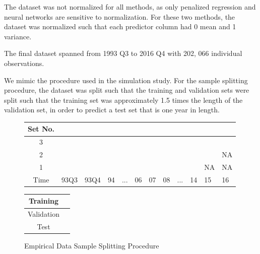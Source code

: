 \documentclass{article}
\begin{document}

The dataset was not normalized for all methods, as only penalized regression and neural networks are sensitive to normalization. For these two methods, the dataset was normalized such that each predictor column had 0 mean and 1 variance.

The final dataset spanned from 1993 Q3 to 2016 Q4 with 202, 066 individual observations.

We mimic the procedure used in the simulation study. For the sample splitting procedure, the dataset was split such that the training and validation sets were split such that the training set was approximately 1.5 times the length of the validation set, in order to predict a test set that is one year in length.

\begin{figure}[!htb]
	\begin{center}
		\begin{tabular}{|c|p{0.55cm}p{0.55cm}p{0.50cm}p{0.50cm}p{0.50cm}p{0.50cm}p{0.50cm}p{0.50cm}p{0.50cm}p{0.50cm}p{0.50cm}|}
			\hline
			Set No. &&&&&&&&&&& \\
			\hline
			3 & \cellcolor{cyan} & \cellcolor{cyan} & \cellcolor{cyan} & \cellcolor{cyan} & \cellcolor{cyan} & \cellcolor{cyan} & 
			\cellcolor{pink} & \cellcolor{pink} & \cellcolor{pink} & \cellcolor{pink} &  \cellcolor{olive} \\
			2 & \cellcolor{cyan} & \cellcolor{cyan} & \cellcolor{cyan} & \cellcolor{cyan} & \cellcolor{cyan} & 
			\cellcolor{pink} & \cellcolor{pink} & \cellcolor{pink} & \cellcolor{pink} & 	
			\cellcolor{olive} & NA \\
			1 & \cellcolor{cyan} & \cellcolor{cyan} & \cellcolor{cyan} & \cellcolor{cyan} & 
			\cellcolor{pink} & \cellcolor{pink} & \cellcolor{pink} & \cellcolor{pink} &
			\cellcolor{olive} & NA & NA \\
			\hline
			Time & 93Q3 & 93Q4 & 94 & ... & 06 & 07 & 08 & ... & 14 & 15 & 16 \\
			\hline
		\end{tabular}
		\medskip
		\begin{tabular}{|c|p{0.55cm}|}
			\hline
			Training & \cellcolor{cyan} \\
			\hline
			Validation & \cellcolor{pink} \\
			\hline
			Test & \cellcolor{olive} \\
			\hline
		\end{tabular}
	\end{center}
	\caption{Empirical Data Sample Splitting Procedure}
	\label{emp_sample_split_diag}
\end{figure}
\end{document}
